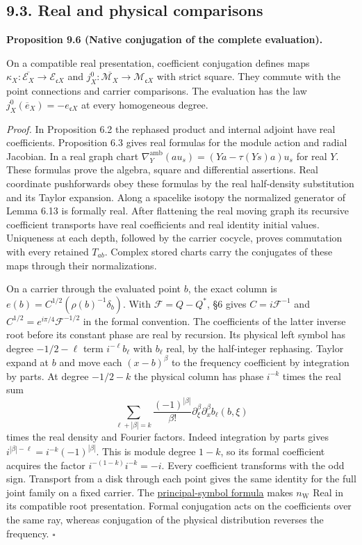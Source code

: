 \documentclass[
  english,
  11pt,
  reqno]{amsart}
\makeatletter
\newcommand{\paperdisplaynext}{%
  \let\paper@savedstartsection\@startsection
  \def\@startsection##1##2##3##4##5##6{%
    \let\@startsection\paper@savedstartsection
    \@tempskipa ##5\relax
    \ifdim\@tempskipa<\z@
      \def\paper@afterskip{.35\baselineskip}%
    \else
      \def\paper@afterskip{##5}%
    \fi
    \@startsection{##1}{##2}{##3}{##4}{\paper@afterskip}{##6}}}
\newcommand{\paperdisplaysection}{\paperdisplaynext\subsection}
\newcommand{\pandocstatementheading}[1]{%
  \par\if@nobreak\else
    \addpenalty{\@beginparpenalty}%
    \addvspace{.5\baselineskip plus .2\baselineskip minus .2\baselineskip}%
  \fi
  {\normalfont\bfseries #1\par}%
  \nobreak\@afterindenttrue\@afterheading
}
\let\paper@displaysection\paperdisplaysection
\renewcommand{\paperdisplaysection}[1]{%
  \let\paper@savedhangfrom\@hangfrom
  \long\def\@hangfrom##1##2{%
    \paper@savedhangfrom{##1}{\paper@headingparagraph##2}}%
  \paper@displaysection{#1}%
  \let\@hangfrom\paper@savedhangfrom}
\makeatother
\begin{document}
\paperdisplaysection{9.3. Real and physical
comparisons}\label{real-and-physical-comparisons}\label{sec:analytic-real-and-physical-maps}

\pandocstatementheading{\leavevmode{}\label{prop:analytic-native-real-parity}Proposition 9.6 (Native conjugation of the complete evaluation).}

On a compatible real presentation, coefficient conjugation defines maps
\(\kappa_X:\overline{\mathscr E_X}\to\mathscr E_{\mathfrak cX}\) and
\(j_X^0:\overline{\mathscr M_X}\to\mathscr M_{\mathfrak cX}\) with
strict square. They commute with the point connections and carrier
comparisons. The evaluation has the law
\(j_X^0(\overline e_X)=-e_{\mathfrak cX}\) at every homogeneous degree.

\emph{Proof.} In Proposition 6.2 the rephased product and internal
adjoint have real coefficients. Proposition 6.3 gives real formulas for
the module action and radial Jacobian. In a real graph chart
\(\nabla_Y^{\mathrm{amb}}(a u_s)=(Ya-\tau(Ys)a)u_s\) for real \(Y\).
These formulas prove the algebra, square and differential assertions.
Real coordinate pushforwards obey these formulas by the real
half-density substitution and its Taylor expansion. Along a spacelike
isotopy the normalized generator of Lemma 6.13 is formally real. After
flattening the real moving graph its recursive coefficient transports
have real coefficients and real identity initial values. Uniqueness at
each depth, followed by the carrier cocycle, proves commutation with
every retained \(T_{ab}\). Complex stored charts carry the conjugates of
these maps through their normalizations.

On a carrier through the evaluated point \(b\), the exact column is
\(e(b)=C^{1/2}(\rho(b)^{-1}\delta_b)\). With \(\mathcal F=Q-Q^*\), §6
gives \(C=i\mathcal F^{-1}\) and \(C^{1/2}=e^{i\pi/4}\mathcal F^{-1/2}\)
in the formal convention. The coefficients of the latter inverse root
before its constant phase are real by recursion. Its physical left
symbol has degree \(-1/2-\ell\) term \(i^{-\ell}b_\ell\) with \(b_\ell\)
real, by the half-integer rephasing. Taylor expand at \(b\) and move
each \((x-b)^\beta\) to the frequency coefficient by integration by
parts. At degree \(-1/2-k\) the physical column has phase \(i^{-k}\)
times the real sum \[
\sum_{\ell+|\beta|=k}\frac{(-1)^{|\beta|}}{\beta!}
\partial_\xi^\beta\partial_x^\beta b_\ell(b,\xi)
\] times the real density and Fourier factors. Indeed integration by
parts gives \(i^{|\beta|-\ell}=i^{-k}(-1)^{|\beta|}\). This is module
degree \(1-k\), so its formal coefficient acquires the factor
\(i^{-(1-k)}i^{-k}=-i\). Every coefficient transforms with the odd sign.
Transport from a disk through each point gives the same identity for the
full joint family on a fixed carrier. The
\hyperref[eq:relative-wave-native-frame]{principal-symbol formula} makes
\(n_{\mathrm W}\) Real in its compatible root presentation. Formal
conjugation acts on the coefficients over the same ray, whereas
conjugation of the physical distribution reverses the frequency.
\hfill\(\square\)
\end{document}

